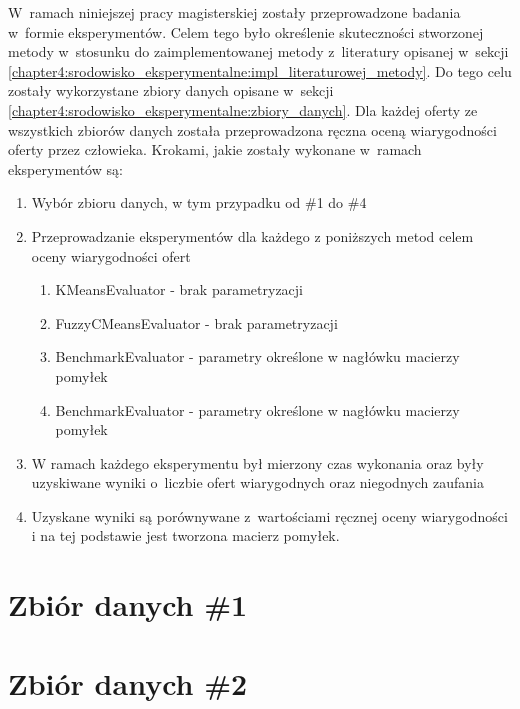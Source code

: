 \documentclass[../Kamil_Kowalewski_Main.tex]{subfiles}
\begin{document}
 {

    W~ramach niniejszej pracy magisterskiej zostały przeprowadzone badania w~formie
    eksperymentów. Celem tego było określenie skuteczności stworzonej metody w~stosunku
    do zaimplementowanej metody z~literatury opisanej w~sekcji
    \ref{chapter4:srodowisko_eksperymentalne:impl_literaturowej_metody}. Do tego celu
    zostały wykorzystane zbiory danych opisane w~sekcji
    \ref{chapter4:srodowisko_eksperymentalne:zbiory_danych}. Dla każdej oferty ze
    wszystkich zbiorów danych została przeprowadzona ręczna oceną wiarygodności oferty
    przez człowieka. Krokami, jakie zostały wykonane w~ramach eksperymentów są:

    \begin{enumerate}[noitemsep,topsep=1pt]
        \item Wybór zbioru danych, w tym przypadku od \#1 do \#4
        \item Przeprowadzanie eksperymentów dla każdego z poniższych metod celem oceny
        wiarygodności ofert
        \begin{enumerate}[noitemsep,topsep=1pt]
            \item KMeansEvaluator - brak parametryzacji
            \item FuzzyCMeansEvaluator - brak parametryzacji
            \item BenchmarkEvaluator - parametry określone w nagłówku macierzy pomyłek
            \item BenchmarkEvaluator - parametry określone w nagłówku macierzy pomyłek
        \end{enumerate}
        \item W ramach każdego eksperymentu był mierzony czas wykonania oraz były
        uzyskiwane wyniki o~liczbie ofert wiarygodnych oraz niegodnych zaufania
        \item Uzyskane wyniki są porównywane z~wartościami ręcznej oceny
        wiarygodności i na tej podstawie jest tworzona macierz pomyłek.
    \end{enumerate}

    \section{Zbiór danych \#1}
    \label{chapter5:eksperymenty:zbior:1} {
        
    }

    \section{Zbiór danych \#2}
    \label{chapter5:eksperymenty:zbior:2} {
        
    }

}
\end{document}
